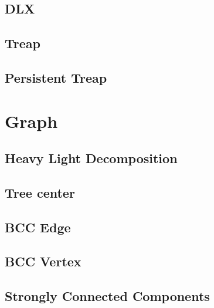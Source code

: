 \documentclass[a4paper,10pt,twocolumn,oneside]{article}
\begin{document}
\subsection{DLX}


\subsection{Treap}


\subsection{Persistent Treap}


% 

\section{Graph}

\subsection{Heavy Light Decomposition}


\subsection{Tree center}


\subsection{BCC Edge}


\subsection{BCC Vertex}


\subsection{Strongly Connected Components}

\end{document}
